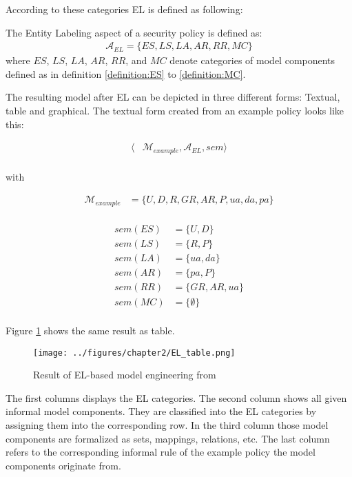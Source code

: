 \documentclass[twoside, openright, 12pt]{book}
\begin{document}
\noindent
According to these categories EL is defined as following:

\begin{xdefinition} 
The Entity Labeling aspect of a security policy is defined as:
\begin{gather*}
\mathcal{A}_{EL} = \lbrace ES,LS,LA,AR,RR,MC\rbrace
\end{gather*}
where $ES$, $LS$, $LA$, $AR$, $RR$, and $MC$ denote categories of model components defined as in definition \ref{definition:ES} to
\label{definition:EL} \ref{definition:MC}.
\end{xdefinition}

\noindent
The resulting model after EL can be depicted in three different forms: Textual, table and graphical.
The textual form created from an example policy looks like this:

\begin{align*}
\langle &\mathcal{M}_{example}, \mathcal{A}_{EL}, sem \rangle \\
\end{align*}

\noindent
with

\begin{align*}
\mathcal{M}_{example} &= \lbrace U, D, R, GR, AR, P, ua, da, pa \rbrace \\
\end{align*}

\begin{align*}
sem(ES) &= \lbrace U, D \rbrace\\
sem(LS) &= \lbrace R, P \rbrace\\
sem(LA) &= \lbrace ua, da \rbrace\\
sem(AR) &= \lbrace pa, P \rbrace\\
sem(RR) &= \lbrace GR, AR, ua \rbrace\\
sem(MC) &= \lbrace \emptyset \rbrace\\
\end{align*}

\noindent
Figure \ref{fig:EL_table} shows the same result as table.

\begin{figure}[htb]
	\centering
	\texttt{[image: ../figures/chapter2/EL\_table.png]}
	\caption{Result of EL-based model engineering from \cite[p.77, table 4.1]{Amthor18}}
	\label{fig:EL_table}
\end{figure}

\noindent
The first columns displays the EL categories.
The second column shows all given informal model components.
They are classified into the EL categories by assigning them into the corresponding row.
In the third column those model components are formalized as sets, mappings, relations, etc.
The last column refers to the corresponding informal rule of the example policy the model components originate from.
\end{document}
